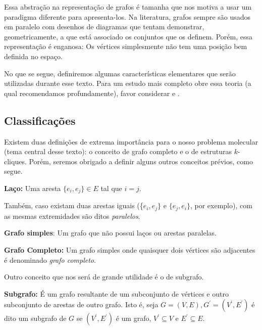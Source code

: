 \documentclass[a4paper,12pt]{article}
\begin{document}
	Essa abstração na representação de grafos é tamanha que nos motiva a usar um paradigma diferente para apresenta-los. Na literatura, grafos sempre são usados em paralelo com desenhos de diagramas que tentam demonstrar, geometricamente, a que está associado os conjuntos que os definem. Porém, essa representação é enganosa: Os vértices simplesmente não tem uma posição bem definida no espaço.
	
	No que se segue, definiremos algumas características elementares que serão utilizadas durante esse texto. Para um estudo mais completo obre essa teoria (a qual recomendamos profundamente), favor considerar \cite{grafos1} e \cite{grafosPremioElon}.
	
	\subsection{Classificações}
	
	Existem duas definições de extrema importância para o nosso problema molecular (tema central desse texto): o conceito de grafo completo e o de estruturas $k$-cliques. Porém, seremos obrigado a definir alguns outros conceitos prévios, como segue. 
	
	
	\begin{center}
		\begin{minipage}{0.9 \linewidth}
			\textbf{Laço:} Uma aresta $\{e_i, e_j\} \in E$ tal que $i = j$.
		\end{minipage}
	\end{center}

	Também, caso existam duas arestas iguais (\{$e_i, e_j\}$ e 
	$\{e_j, e_i\}$, por exemplo), com as mesmas extremidades são ditos \textit{paralelos}.

	\begin{center}
		\begin{minipage}{0.9 \linewidth}
			\textbf{Grafo simples}: Um grafo que não possui laços ou arestas paralelas.
		\end{minipage}
	\end{center}
	
	\begin{center}
		\begin{minipage}{0.9 \linewidth}
			\textbf{Grafo Completo:} Um grafo simples onde quaisquer dois vértices são adjacentes é denominado \textit{grafo completo}.
		\end{minipage}
	\end{center}
	
	Outro conceito que nos será de grande utilidade é o de subgrafo.
	\begin{center}
		\begin{minipage}{0.9 \linewidth}
			\textbf{Subgrafo:} É um grafo resultante de um subconjunto de vértices e outro subconjunto de arestas de outro grafo. Isto é, seja $G = (V, E), G^\prime = (V^\prime, E^\prime)$ é dito um subgrafo de $G$ se $(V^\prime, E^\prime)$ é um grafo, $V^\prime \subseteq V$ e $E^\prime \subseteq E$.
		\end{minipage}
	\end{center}
	
\end{document}
